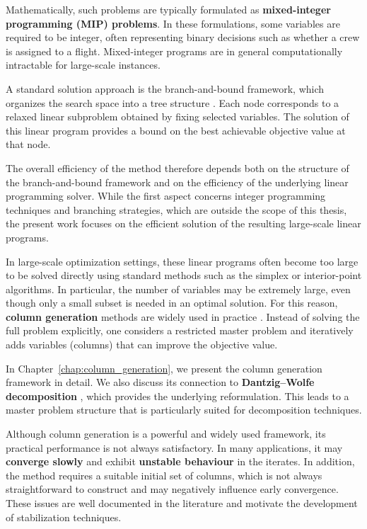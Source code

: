 \documentclass{book}
\theoremstyle{definition}
\newcounter{algorithm_}
\numberwithin{algorithm_}{chapter}
\begin{document}
\bigskip

Mathematically, such problems are typically formulated as \textbf{mixed-integer programming (MIP) problems}. 
In these formulations, some variables are required to be integer, often representing binary decisions such as whether a crew is assigned to a flight. 
Mixed-integer programs are in general computationally intractable for large-scale instances.

A standard solution approach is the branch-and-bound framework, which organizes the search space into a tree structure \cite{vanderbeck2000dantzig, ryan1981integer}. 
Each node corresponds to a relaxed linear subproblem obtained by fixing selected variables. 
The solution of this linear program provides a bound on the best achievable objective value at that node.

The overall efficiency of the method therefore depends both on the structure of the branch-and-bound framework and on the efficiency of the underlying linear programming solver. 
While the first aspect concerns integer programming techniques and branching strategies, which are outside the scope of this thesis, the present work focuses on the efficient solution of the resulting large-scale linear programs.

\bigskip

In large-scale optimization settings, these linear programs often become too large to be solved directly using standard methods such as the simplex or interior-point algorithms. 
In particular, the number of variables may be extremely large, even though only a small subset is needed in an optimal solution.
For this reason, \textbf{column generation} methods are widely used in practice \cite{ford1958suggested, desaulniers2006column, Lubbecke2011}. 
Instead of solving the full problem explicitly, one considers a restricted master problem and iteratively adds variables (columns) that can improve the objective value.

In Chapter~\ref{chap:column_generation}, we present the column generation framework in detail. 
We also discuss its connection to \textbf{Dantzig--Wolfe decomposition} \cite{dantzig1960decomposition}, which provides the underlying reformulation. 
This leads to a master problem structure that is particularly suited for decomposition techniques.

\bigskip

Although column generation is a powerful and widely used framework, its practical performance is not always satisfactory. 
In many applications, it may \textbf{converge slowly} and exhibit \textbf{unstable behaviour} in the iterates. 
In addition, the method requires a suitable initial set of columns, which is not always straightforward to construct and may negatively influence early convergence. 
These issues are well documented in the literature \cite{Lubbecke2011, vanderbeck2005} and motivate the development of stabilization techniques.
\end{document}
